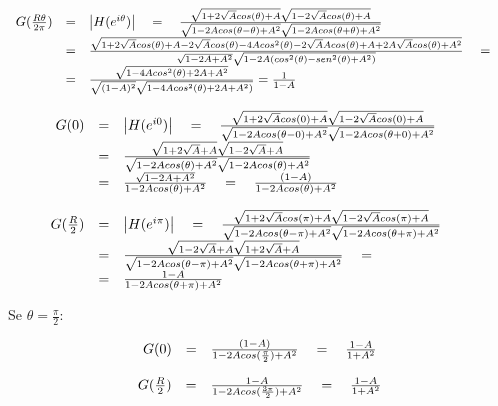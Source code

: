 \[
\begin{array}{l c l c l}
  G(\frac{R\theta}{2\pi}) & = & \left| H(e^{i\theta}) \right| \quad = \quad \frac{\sqrt{1+2\sqrt{A}cos(\theta) + A} \sqrt{1-2\sqrt{A}cos(\theta) + A}}{\sqrt{1-2Acos(\theta-\theta)+A^2}\sqrt{1-2Acos(\theta+\theta)+A^2}} \quad & \\
  & = & \frac{\sqrt{1+2\sqrt{A}cos(\theta)+A-2\sqrt{A}cos(\theta)-4Acos^2(\theta)-2\sqrt{A}Acos(\theta)+A+2A\sqrt{A}cos(\theta)+A^2}}{\sqrt{1-2A+A^2}\sqrt{1-2A(cos^2(\theta)-sen^2(\theta)+A^2)}} \quad = \\
  & = & \frac{\sqrt{1-4Acos^2(\theta)+2A+A^2}}{\sqrt{(1-A)^2} \sqrt{1-4Acos^2(\theta)+2A+A^2)}} = \frac{1}{1-A}
\end{array}
\]

\[
\begin{array}{l c l c l}
  G(0) & = & \left| H(e^{i0}) \right| \quad = \quad \frac{\sqrt{1+2\sqrt{A}cos(0) + A} \sqrt{1-2\sqrt{A}cos(0) + A}}{\sqrt{1-2Acos(\theta-0)+A^2}\sqrt{1-2Acos(\theta+0)+A^2}} \quad & \\
       & = & \frac{\sqrt{1+2\sqrt{A} + A} \sqrt{1-2\sqrt{A} + A}}{\sqrt{1-2Acos(\theta)+A^2}\sqrt{1-2Acos(\theta)+A^2}} \quad & \\
       & = & \frac{\sqrt{1-2A+A^2}}{1-2Acos(\theta)+A^2} \quad = \quad \frac{(1-A)}{1-2Acos(\theta)+A^2} \\
\end{array}
\]

\[
\begin{array}{l c l c l}
  G(\frac{R}{2}) & = & \left| H(e^{i\pi}) \right| \quad = \quad \frac{\sqrt{1+2\sqrt{A}cos(\pi) + A} \sqrt{1-2\sqrt{A}cos(\pi) + A}}{\sqrt{1-2Acos(\theta-\pi)+A^2}\sqrt{1-2Acos(\theta+\pi)+A^2}} \quad & \\
         & = & \frac{\sqrt{1-2\sqrt{A}+A} \sqrt{1+2\sqrt{A}+A}}{\sqrt{1-2Acos(\theta-\pi)+A^2}\sqrt{1-2Acos(\theta+\pi)+A^2}} \quad = \\
         & = & \frac{1-A}{1-2Acos(\theta+\pi)+A^2} \\
\end{array}
\]

Se $\theta = \frac{\pi}{2}$:

\[
\begin{array}{l c l c l}
  G(0) & = & \frac{(1-A)}{1-2Acos(\frac{\pi}{2})+A^2} \quad = \quad \frac{1-A}{1+A^2} \\
\end{array}
\]

\[
\begin{array}{l c l c l}
  G(\frac{R}{2}) & = & \frac{1-A}{1-2Acos(\frac{3\pi}{2})+A^2} \quad  = \quad \frac{1-A}{1+A^2} \\
\end{array}
\]

